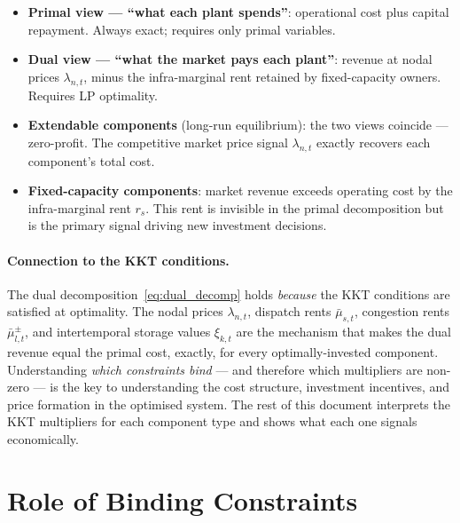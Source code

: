 \documentclass{article}
\begin{document}
\begin{tcolorbox}[colback=blue!5, colframe=blue!40!black,
  title={Two views of the same total cost}]
\begin{itemize}
    \item \textbf{Primal view --- ``what each plant spends''}:
          operational cost plus capital repayment.  Always exact; requires
          only primal variables.
    \item \textbf{Dual view --- ``what the market pays each plant''}:
          revenue at nodal prices $\lambda_{n,t}$, minus the infra-marginal rent
          retained by fixed-capacity owners.  Requires LP optimality.
    \item \textbf{Extendable components} (long-run equilibrium): the two views
          coincide --- zero-profit.  The competitive market price signal
          $\lambda_{n,t}$ exactly recovers each component's total cost.
    \item \textbf{Fixed-capacity components}: market revenue exceeds operating
          cost by the infra-marginal rent $r_s$.  This rent is invisible in
          the primal decomposition but is the primary signal driving new
          investment decisions.
\end{itemize}
\end{tcolorbox}

\paragraph{Connection to the KKT conditions.}
The dual decomposition~\eqref{eq:dual_decomp} holds \emph{because} the KKT
conditions are satisfied at optimality.  The nodal prices $\lambda_{n,t}$,
dispatch rents $\bar{\mu}_{s,t}$, congestion rents $\bar{\mu}^{\pm}_{l,t}$,
and intertemporal storage values $\xi_{k,t}$ are the mechanism that makes the
dual revenue equal the primal cost, exactly, for every optimally-invested
component.  Understanding \emph{which constraints bind} --- and therefore
which multipliers are non-zero --- is the key to understanding the cost
structure, investment incentives, and price formation in the optimised system.
The rest of this document interprets the KKT multipliers for each component
type and shows what each one signals economically.

\section{Role of Binding Constraints}
\label{sec:binding}
\end{document}
